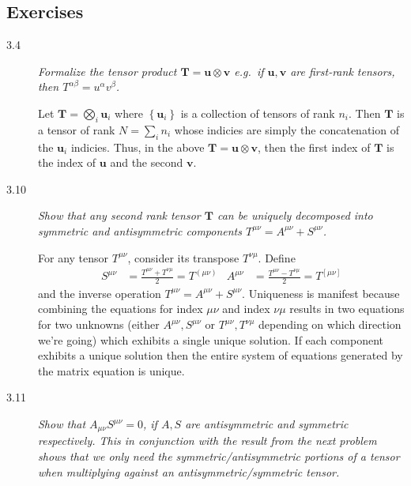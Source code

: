\documentclass[12pt]{report}
\newcommand{\bm}[1]{\boldsymbol{\mathbf{#1}}}
\begin{document}
\subsection{Exercises}

\begin{description}
    \item[3.4] \emph{Formalize the tensor product $\bm{T} = \bm{u}
        \otimes \bm{v}$ e.g.\ if $\bm{u}, \bm{v}$ are first-rank
        tensors, then $T^{\alpha\beta} = u^\alpha v^\beta$.}

        Let $\bm{T} = \bigotimes_i \bm{u}_i$ where $\left\{ \bm{u}_i
        \right\}$ is a collection of tensors of rank $n_i$. Then $\bm{T}$ is
        a tensor of rank $N = \sum\limits_{i}^{}n_i$ whose indicies are simply
        the concatenation of the $\bm{u}_i$ indicies. Thus, in the above
        $\bm{T} = \bm{u} \otimes \bm{v}$, then the first index of
        $\bm{T}$ is the index of $\bm{u}$ and the second $\bm{v}$.

    \item[3.10] \emph{Show that any second rank tensor $\bm{T}$ can be
        uniquely decomposed into symmetric and antisymmetric components
        $T^{\mu\nu} = A^{\mu\nu} + S^{\mu\nu}$.}

        For any tensor $T^{\mu\nu}$, consider its transpose $T^{\nu\mu}$. Define
        \begin{align*}
            S^{\mu\nu} &= \frac{T^{\mu\nu} + T^{\nu\mu}}{2} = T^{(\mu\nu)} &
            A^{\mu\nu} &= \frac{T^{\mu\nu} - T^{\nu\mu}}{2} = T^{[\mu\nu]}
        \end{align*}
        and the inverse operation $T^{\mu\nu} = A^{\mu\nu} + S^{\mu\nu}$.
        Uniqueness is manifest because combining the equations for index
        $\mu\nu$ and index $\nu\mu$ results in two equations for two unknowns
        (either $A^{\mu\nu}, S^{\mu\nu}$ or $T^{\mu\nu}, T^{\nu\mu}$ depending
        on which direction we're going) which exhibits a single unique solution.
        If each component exhibits a unique solution then the entire system of
        equations generated by the matrix equation is unique.

    \item[3.11] \emph{Show that $A_{\mu\nu}S^{\mu\nu} = 0$, if $A,S$ are
        antisymmetric and symmetric respectively. This in conjunction with the
        result from the next problem shows that we only need the
        symmetric/antisymmetric portions of a tensor when multiplying against an
        antisymmetric/symmetric tensor.}


\end{description}
\end{document}
